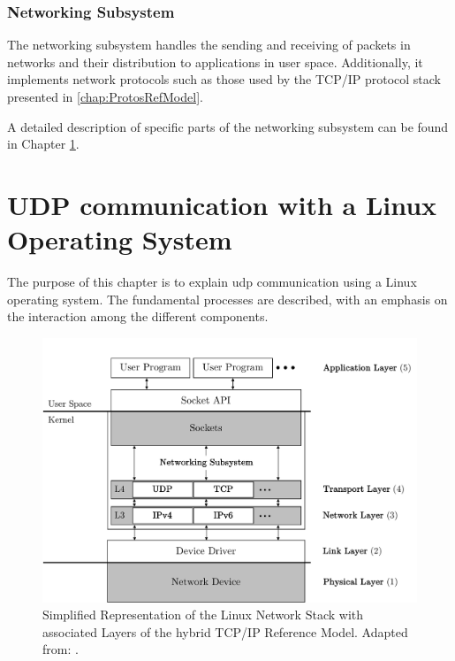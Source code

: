 \subsubsection{Networking Subsystem}
The networking subsystem handles the sending and receiving of packets in networks and their distribution to applications in user space. Additionally, it implements network protocols such as those used by the TCP/IP protocol stack presented in \ref{chap:ProtosRefModel}.

A detailed description of specific parts of the networking subsystem can be found in Chapter \ref{chap:LinuxUDPNWStack}.

\clearpage

\section{UDP communication with a Linux Operating System} \label{chap:LinuxUDPNWStack}
The purpose of this chapter is to explain \ac{udp} communication using a Linux operating system. The fundamental processes are described, with an emphasis on the interaction among the different components.

\begin{figure}[h]
    \centering
    \includegraphics[width=1\linewidth]{figures/linux_nwstack/image03.pdf}
    \caption[Simplified Representation of the Linux Network Stack with associated Layers of the hybrid TCP/IP Reference Model]{Simplified Representation of the Linux Network Stack with associated Layers of the hybrid TCP/IP Reference Model. Adapted from: \cite{lins06}.}
    \label{fig:NWStack}
\end{figure}

